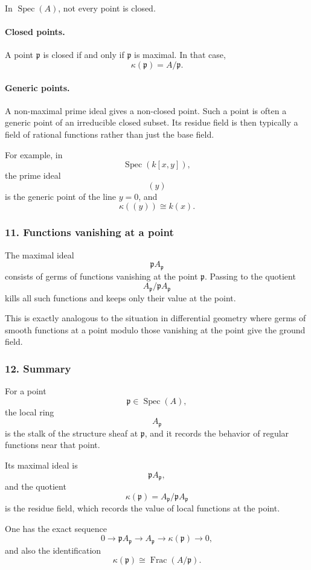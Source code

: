 \documentclass[12pt,a4paper]{article}
\theoremstyle{notespace}
\newcommand{\Spec}{\operatorname{Spec}}
\theoremstyle{definition}
\begin{document}
In \(\Spec(A)\), not every point is closed.

\paragraph{Closed points.}
A point \(\mathfrak p\) is closed if and only if \(\mathfrak p\) is maximal. In that case,
\[
\kappa(\mathfrak p)=A/\mathfrak p.
\]

\paragraph{Generic points.}
A non-maximal prime ideal gives a non-closed point. Such a point is often a generic point of an irreducible closed subset. Its residue field is then typically a field of rational functions rather than just the base field.

For example, in
\[
\Spec(k[x,y]),
\]
the prime ideal
\[
(y)
\]
is the generic point of the line \(y=0\), and
\[
\kappa((y))\cong k(x).
\]

\subsubsection{11. Functions vanishing at a point}

The maximal ideal
\[
\mathfrak p A_{\mathfrak p}
\]
consists of germs of functions vanishing at the point \(\mathfrak p\). Passing to the quotient
\[
A_{\mathfrak p}/\mathfrak p A_{\mathfrak p}
\]
kills all such functions and keeps only their value at the point.

This is exactly analogous to the situation in differential geometry where germs of smooth functions at a point modulo those vanishing at the point give the ground field.

\subsubsection{12. Summary}

For a point
\[
\mathfrak p\in \Spec(A),
\]
the local ring
\[
A_{\mathfrak p}
\]
is the stalk of the structure sheaf at \(\mathfrak p\), and it records the behavior of regular functions near that point.

Its maximal ideal is
\[
\mathfrak p A_{\mathfrak p},
\]
and the quotient
\[
\kappa(\mathfrak p)=A_{\mathfrak p}/\mathfrak p A_{\mathfrak p}
\]
is the residue field, which records the value of local functions at the point.

One has the exact sequence
\[
0
\longrightarrow
\mathfrak p A_{\mathfrak p}
\longrightarrow
A_{\mathfrak p}
\longrightarrow
\kappa(\mathfrak p)
\longrightarrow
0,
\]
and also the identification
\[
\kappa(\mathfrak p)\cong \operatorname{Frac}(A/\mathfrak p).
\]
\end{document}
